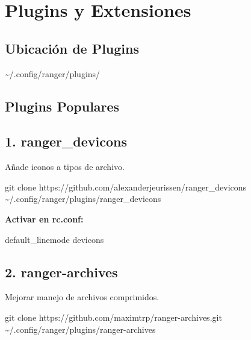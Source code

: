 \documentclass[
  doc,
  floatsintext,
  longtable,
  a4paper,
  nolmodern,
  notxfonts,
  notimes,
  12pt,
  colorlinks=true,linkcolor=blue,citecolor=blue,urlcolor=blue]{apa7}
\newenvironment{Shaded}{\begin{snugshade}}{\end{snugshade}}
\newcommand{\ExtensionTok}[1]{\textcolor[rgb]{0.00,0.23,0.31}{#1}}
\newcommand{\FunctionTok}[1]{\textcolor[rgb]{0.28,0.35,0.67}{#1}}
\newcommand{\NormalTok}[1]{\textcolor[rgb]{0.00,0.23,0.31}{#1}}
\begin{document}
\section{Plugins y Extensiones}\label{plugins-y-extensiones}

\subsection{Ubicación de Plugins}\label{ubicaciuxf3n-de-plugins}

\begin{Shaded}
\begin{Highlighting}[]
\ExtensionTok{\textasciitilde{}/.config/ranger/plugins/}
\end{Highlighting}
\end{Shaded}

\subsection{Plugins Populares}\label{plugins-populares}

\subsection{1. ranger\_devicons}\label{ranger_devicons}

Añade iconos a tipos de archivo.

\begin{Shaded}
\begin{Highlighting}[]
\FunctionTok{git}\NormalTok{ clone https://github.com/alexanderjeurissen/ranger\_devicons \textasciitilde{}/.config/ranger/plugins/ranger\_devicons}
\end{Highlighting}
\end{Shaded}

\textbf{Activar en rc.conf:}

\begin{Shaded}
\begin{Highlighting}[]
\ExtensionTok{default\_linemode}\NormalTok{ devicons}
\end{Highlighting}
\end{Shaded}

\subsection{2. ranger-archives}\label{ranger-archives}

Mejorar manejo de archivos comprimidos.

\begin{Shaded}
\begin{Highlighting}[]
\FunctionTok{git}\NormalTok{ clone https://github.com/maximtrp/ranger{-}archives.git \textasciitilde{}/.config/ranger/plugins/ranger{-}archives}
\end{Highlighting}
\end{Shaded}
\end{document}
